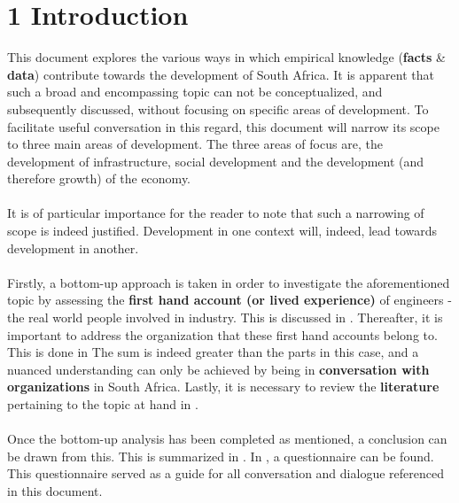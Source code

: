 \chapter*{1 Introduction}
\label{intro}
This document explores the various ways in which empirical knowledge (\textbf{facts} \& \textbf{data}) contribute towards the development of South Africa. It is apparent that such a broad and encompassing topic can not be conceptualized, and subsequently discussed, without focusing on specific areas of development. To facilitate useful conversation in this regard, this document will narrow its scope to three main areas of development. The three areas of focus are, the development of infrastructure, social development and the development (and therefore growth) of the economy.
\\\\
It is of particular importance for the reader to note that such a narrowing of scope is indeed justified. Development in one context will, indeed, lead towards development in another. 
\\\\
Firstly, a bottom-up approach is taken in order to investigate the aforementioned topic by assessing the \textbf{first hand account (or lived experience)} of engineers - the real world people involved in industry. This is discussed in \textbf{}. Thereafter, it is important to address the organization that these first hand accounts belong to. This is done in \textbf{} The sum is indeed greater than the parts in this case, and a nuanced understanding can only be achieved by being in \textbf{conversation with organizations} in South Africa. Lastly, it is necessary to review the \textbf{literature} pertaining to the topic at hand in \textbf{}. 
\\\\
Once the bottom-up analysis has been completed as mentioned, a conclusion can be drawn from this. This is summarized in \textbf{}. In \textbf{}, a questionnaire can be found. This questionnaire served as a guide for all conversation and dialogue referenced in this document.


